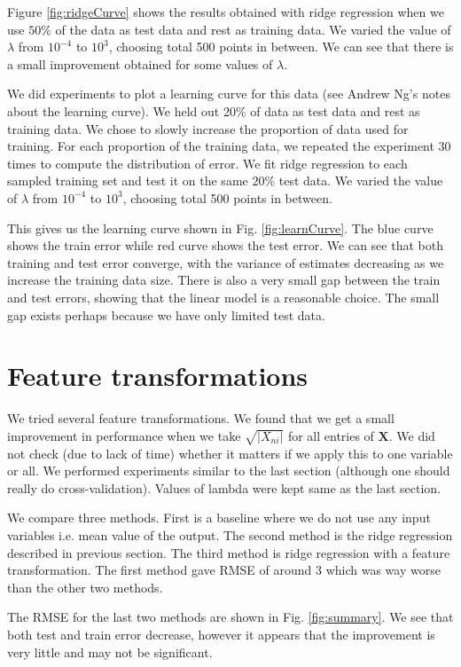 \documentclass{article} %
\begin{document}
Figure \ref{fig:ridgeCurve} shows the results obtained with ridge regression when we use $50\%$ of the data as test data and rest as training data. We varied the value of $\lambda$ from $10^{-4}$ to $10^3$, choosing total 500 points in between. We can see that there is a small improvement obtained for some values of $\lambda$.

We did experiments to plot a learning curve for this data (see Andrew Ng's notes about the learning curve). We held out 20\% of data as test data and rest as training data. We chose to slowly increase the proportion of data used for training. For each proportion of the training data, we repeated the experiment 30 times to compute the distribution of error. We fit ridge regression to each sampled training set and test it on the same $20\%$ test data. We varied the value of $\lambda$ from $10^{-4}$ to $10^3$, choosing total 500 points in between.

This gives us the learning curve shown in Fig. \ref{fig:learnCurve}. The blue curve shows the train error while red curve shows the test error. We can see that both training and test error converge, with the variance of estimates decreasing as we increase the training data size. There is also a very small gap between the train and test errors, showing that the linear model is a reasonable choice. The small gap exists perhaps because we have only limited test data.

\section{Feature transformations}
We tried several feature transformations. We found that we get a small improvement in performance when we take $\sqrt{|X_{ni}|}$ for all entries of $\mathbf{X}$. We did not check (due to lack of time) whether it matters if we apply this to one variable or all. We performed experiments similar to the last section (although one should really do cross-validation). Values of lambda were kept same as the last section. 

We compare three methods. First is a baseline where we do not use any input variables i.e. mean value of the output. The second method is the ridge regression described in previous section. The third method is ridge regression with a feature transformation. The first method gave RMSE of around 3 which was way worse than the other two methods.

The RMSE for the last two methods are shown in Fig. \ref{fig:summary}. We see that both test and train error decrease, however it appears that the improvement is very little and may not be significant.
\end{document}

